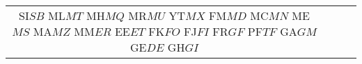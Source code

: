 \begin{tabular}{ c | c | c | c | }
SI$ %
SB$ %
ML$ %
MT$ %
MH$ %
MQ$ %
MR$ %
MU$ %
YT$ %
MX$ %
FM$ %
MD$ %
MC$ %
MN$ %
ME$ %
MS$ %
MA$ %
MZ$ %
MM$ %
ER$ %
EE$ %
ET$ %
FK$ %
FO$ %
FJ$ %
FI$ %
FR$ %
GF$ %
PF$ %
TF$ %
GA$ %
GM$ %
GE$ %
DE$ %
GH$ %
GI$ %
\end{tabular}
